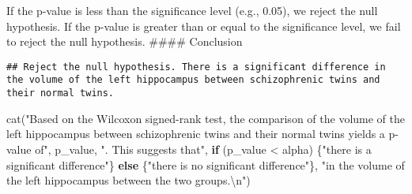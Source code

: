 \documentclass[
]{article}
\newenvironment{Shaded}{\begin{snugshade}}{\end{snugshade}}
\newcommand{\ControlFlowTok}[1]{\textcolor[rgb]{0.13,0.29,0.53}{\textbf{#1}}}
\newcommand{\FloatTok}[1]{\textcolor[rgb]{0.00,0.00,0.81}{#1}}
\newcommand{\FunctionTok}[1]{\textcolor[rgb]{0.00,0.00,0.00}{#1}}
\newcommand{\NormalTok}[1]{#1}
\newcommand{\OtherTok}[1]{\textcolor[rgb]{0.56,0.35,0.01}{#1}}
\newcommand{\SpecialCharTok}[1]{\textcolor[rgb]{0.00,0.00,0.00}{#1}}
\newcommand{\StringTok}[1]{\textcolor[rgb]{0.31,0.60,0.02}{#1}}
\begin{document}
If the p-value is less than the significance level (e.g., 0.05), we
reject the null hypothesis. If the p-value is greater than or equal to
the significance level, we fail to reject the null hypothesis. \#\#\#\#
Conclusion

\begin{Shaded}
\end{Shaded}

\begin{verbatim}
## Reject the null hypothesis. There is a significant difference in the volume of the left hippocampus between schizophrenic twins and their normal twins.
\end{verbatim}

\begin{Shaded}
\begin{Highlighting}[]
\FunctionTok{cat}\NormalTok{(}\StringTok{"Based on the Wilcoxon signed{-}rank test, the comparison of the volume of the left hippocampus between schizophrenic twins and their normal twins yields a p{-}value of"}\NormalTok{, p\_value, }\StringTok{". This suggests that"}\NormalTok{, }\ControlFlowTok{if}\NormalTok{ (p\_value }\SpecialCharTok{\textless{}}\NormalTok{ alpha) \{}\StringTok{"there is a significant difference"}\NormalTok{\} }\ControlFlowTok{else}\NormalTok{ \{}\StringTok{"there is no significant difference"}\NormalTok{\}, }\StringTok{"in the volume of the left hippocampus between the two groups.}\SpecialCharTok{\textbackslash{}n}\StringTok{"}\NormalTok{)}
\end{Highlighting}
\end{Shaded}
\end{document}
